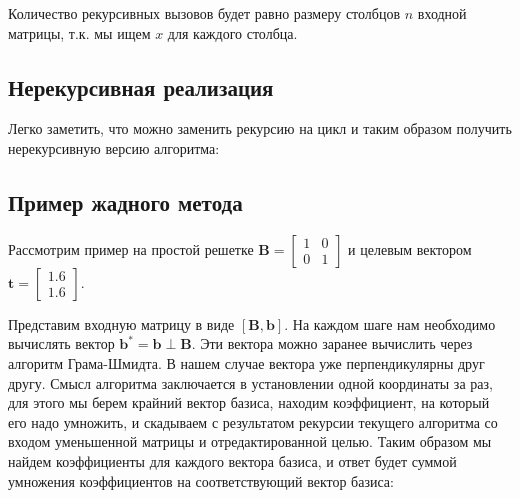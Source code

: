 Количество рекурсивных вызовов будет равно размеру столбцов $ n $ входной матрицы, т.к. мы ищем $ x $ для каждого столбца.

\subsection{Нерекурсивная реализация}

Легко заметить, что можно заменить рекурсию на цикл и таким образом получить нерекурсивную версию алгоритма:

\begin{algorithmic}

\EndFor
\end{algorithmic}

\subsection{Пример жадного метода}

Рассмотрим пример на простой решетке $ \mathbf{B} = \left[\begin{array}{cccc}
1 & 0 \\
0 & 1
\end{array}\right] $ и целевым вектором $ \mathbf{t} = \left[\begin{array}{cccc}
1.6 \\
1.6
\end{array}\right] $.

Представим входную матрицу в виде $ \left[\mathbf{B}, \mathbf{b}\right] $. На каждом шаге нам необходимо вычислять вектор $ \mathbf{b}^* = \mathbf{b} \perp \mathbf{B} $. Эти вектора можно заранее вычислить через алгоритм Грама-Шмидта. В нашем случае вектора уже перпендикулярны друг другу. Смысл алгоритма заключается в установлении одной координаты за раз, для этого мы берем крайний вектор базиса, находим коэффициент, на который его надо умножить, и скадываем с результатом рекурсии текущего алгоритма со входом уменьшенной матрицы и отредактированной целью. Таким образом мы найдем коэффициенты для каждого вектора базиса, и ответ будет суммой умножения коэффициентов на соответствующий вектор базиса:

